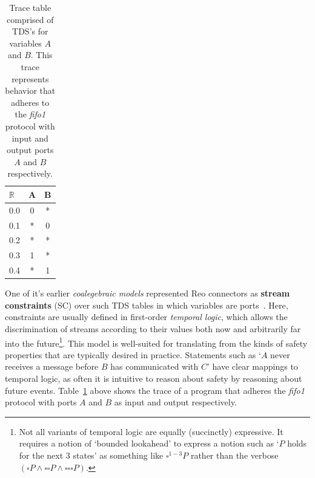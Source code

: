 \begin{table}[]
	\centering
	\begin{tabular}{l|cc}
		$\mathbb{R}$  & A & B \\ \hline
		0.0 & 0 & * \\
		0.1 & * & 0 \\
		0.2 & * & * \\
		0.3 & 1 & * \\
		0.4 & * & 1
	\end{tabular}
	\caption[Trace table of a system adherent to fifo1.]{Trace table comprised of TDS's for variables $A$ and $B$. This trace represents behavior that adheres to the \textit{fifo1} protocol with input and output ports $A$ and $B$ respectively.}
	\label{tab:fifo1_eg}
\end{table}


One of it's earlier \textit{coalegebraic models} represented Reo connectors as \textbf{stream constraints} (SC) over such TDS tables in which variables are ports~\cite{arbab2004reo}. Here, constraints are usually defined in first-order \textit{temporal logic}, which allows the discrimination of streams according to their values both now and arbitrarily far into the future\footnote{Not all variants of temporal logic are equally (succinctly) expressive. It requires a notion of `bounded lookahead' to express a notion such as `$P$ holds for the next 3 states' as something like $\square ^{1-3} P$ rather than the verbose $(\square P \wedge \square \square P \wedge \square \square \square P)$.}. This model is well-suited for translating from the kinds of safety properties that are typically desired in practice. Statements such as `$A$ never receives a message before $B$ has communicated with $C$' have clear mappings to temporal logic, as often it is intuitive to reason about safety by reasoning about future events. Table~\ref{tab:fifo1_eg} above shows the trace of a program that adheres the \textit{fifo1} protocol with ports $A$ and $B$ as input and output respectively.

